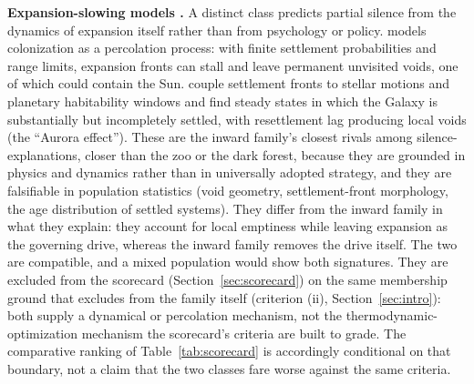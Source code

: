 \documentclass[11pt]{article}
\begin{document}
\textbf{Expansion-slowing models \citep{Landis1998,CarrollNellenback2019}.} A distinct class predicts partial silence from the dynamics of expansion itself rather than from psychology or policy. \citet{Landis1998} models colonization as a percolation process: with finite settlement probabilities and range limits, expansion fronts can stall and leave permanent unvisited voids, one of which could contain the Sun. \citet{CarrollNellenback2019} couple settlement fronts to stellar motions and planetary habitability windows and find steady states in which the Galaxy is substantially but incompletely settled, with resettlement lag producing local voids (the ``Aurora effect''). These are the inward family's closest rivals among silence-explanations, closer than the zoo or the dark forest, because they are grounded in physics and dynamics rather than in universally adopted strategy, and they are falsifiable in population statistics (void geometry, settlement-front morphology, the age distribution of settled systems). They differ from the inward family in what they explain: they account for local emptiness while leaving expansion as the governing drive, whereas the inward family removes the drive itself. The two are compatible, and a mixed population would show both signatures. They are excluded from the scorecard (Section~\ref{sec:scorecard}) on the same membership ground that excludes \citet{Cirkovic2008} from the family itself (criterion (ii), Section~\ref{sec:intro}): both supply a dynamical or percolation mechanism, not the thermodynamic-optimization mechanism the scorecard's criteria are built to grade. The comparative ranking of Table~\ref{tab:scorecard} is accordingly conditional on that boundary, not a claim that the two classes fare worse against the same criteria.
\end{document}
